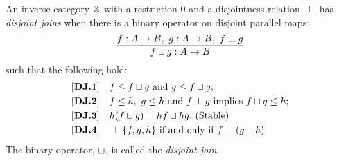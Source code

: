 \begin{definition}\label{def:disjoint_join}
  An inverse category $\mathbb{X}$ with a restriction $0$ and a disjointness relation $\perp$ has
  \emph{disjoint joins} when there is a binary operator on disjoint parallel maps:
  \[
    \infer{f \djoin g : A \to B}{f: A\to B,\ g: A\to B,\ f \perp g}
  \]
  such that the following hold:
  \begin{align*}
    \axiom{DJ}{1}\quad & f \le f \djoin g\text{ and }g \le f \djoin g; \\
    \axiom{DJ}{2}\quad & f \le h,\ g \le h\text{ and }f\perp g\text{ implies }f \djoin g \le h;\\
    \axiom{DJ}{3}\quad & h(f \djoin g) = h f \djoin h g. \text{ (Stable)} \\
    \axiom{DJ}{4}\quad & \cdperp \{f, g, h\}\text{ if and only if }f \perp (g\djoin h).\\
  \end{align*}
  The binary operator, $\sqcup$, is called the \emph{disjoint join}.
\end{definition}

